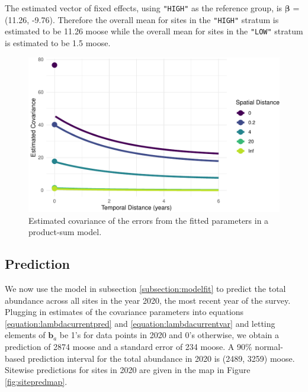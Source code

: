 \documentclass[]{interact}
\theoremstyle{plain}%
\theoremstyle{definition}
\theoremstyle{remark}
\begin{document}
The estimated vector of fixed effects, using \texttt{"HIGH"} as the
reference group, is \(\bm{\beta}\) = (11.26, -9.76). Therefore the
overall mean for sites in the \texttt{"HIGH"} stratum is estimated to be
11.26 moose while the overall mean for sites in the \texttt{"LOW"}
stratum is estimated to be 1.5 moose.

\begin{figure}
\centering
\includegraphics{fpspatiotemp_manu_files/figure-latex/covplot-1.pdf}
\caption{\label{fig:covplot} Estimated covariance of the errors from the
fitted parameters in a product-sum model.}
\end{figure}

\subsection{Prediction}

We now use the model in subsection \ref{subsection:modelfit} to predict
the total abundance across all sites in the year 2020, the most recent
year of the survey. Plugging in estimates of the covariance parameters
into equations \ref{equation:lambdacurrentpred} and
\ref{equation:lambdacurrentvar} and letting elements of \(\mathbf{b}_a\)
be 1's for data points in 2020 and 0's otherwise, we obtain a prediction
of 2874 moose and a standard error of 234 moose. A 90\% normal-based
prediction interval for the total abundance in 2020 is (2489, 3259)
moose. Sitewise predictions for sites in 2020 are given in the map in
Figure \ref{fig:sitepredmap}.
\end{document}
